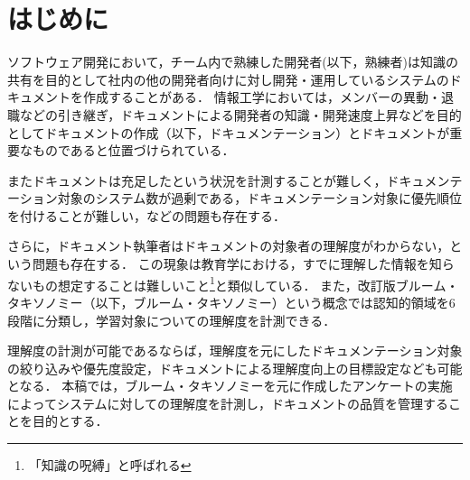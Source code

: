 \section{はじめに}
ソフトウェア開発において，チーム内で熟練した開発者(以下，熟練者)は知識の共有を目的として社内の他の開発者向けに対し開発・運用しているシステムのドキュメントを作成することがある．
情報工学においては，メンバーの異動・退職などの引き継ぎ，ドキュメントによる開発者の知識・開発速度上昇などを目的としてドキュメントの作成（以下，ドキュメンテーション）とドキュメントが重要なものであると位置づけられている\cite{bib:ozawa}．

またドキュメントは充足したという状況を計測することが難しく，ドキュメンテーション対象のシステム数が過剰である，ドキュメンテーション対象に優先順位を付けることが難しい，などの問題も存在する．

さらに，ドキュメント執筆者はドキュメントの対象者の理解度がわからない，という問題も存在する．
この現象は教育学における，すでに理解した情報を知らないもの想定することは難しいこと\footnote{「知識の呪縛」と呼ばれる}\cite{bib:kaneda}と類似している．
また，改訂版ブルーム・タキソノミー（以下，ブルーム・タキソノミー）という概念では認知的領域を6段階に分類し，学習対象についての理解度を計測できる．

理解度の計測が可能であるならば，理解度を元にしたドキュメンテーション対象の絞り込みや優先度設定，ドキュメントによる理解度向上の目標設定なども可能となる．
本稿では，ブルーム・タキソノミーを元に作成したアンケートの実施によってシステムに対しての理解度を計測し，ドキュメントの品質を管理することを目的とする．
